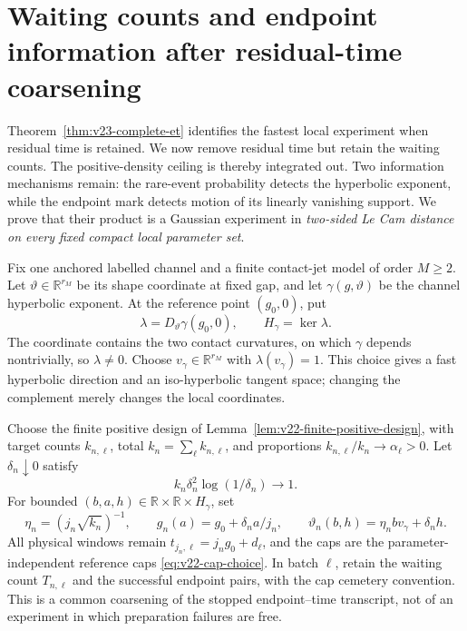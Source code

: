 \section{Waiting counts and endpoint information after residual-time coarsening}
\label{sec:v23-count-endpoint}

Theorem~\ref{thm:v23-complete-et} identifies the fastest local experiment
when residual time is retained.  We now remove residual time but retain the
waiting counts.  The positive-density ceiling is thereby integrated out.
Two information mechanisms remain: the rare-event probability detects the
hyperbolic exponent, while the endpoint mark detects motion of its linearly
vanishing support.  We prove that their product is a Gaussian experiment in
\emph{two-sided Le Cam distance on every fixed compact local parameter set}.

Fix one anchored labelled channel and a finite contact-jet model of order
\(M\ge2\).  Let \(\vartheta\in\mathbb R^{r_M}\) be its shape coordinate at
fixed gap, and let \(\gamma(g,\vartheta)\) be the channel hyperbolic exponent.
At the reference point \((g_0,0)\), put
\[
 \lambda=D_\vartheta\gamma(g_0,0),\qquad H_\gamma=\ker\lambda.
\]
The coordinate contains the two contact curvatures, on which \(\gamma\)
depends nontrivially, so \(\lambda\ne0\).  Choose
\(v_\gamma\in\mathbb R^{r_M}\) with \(\lambda(v_\gamma)=1\).
This choice gives a fast hyperbolic direction and an iso-hyperbolic tangent
space; changing the complement merely changes the local coordinates.

Choose the finite positive design of
Lemma~\ref{lem:v22-finite-positive-design}, with target counts
\(k_{n,\ell}\), total \(k_n=\sum_\ell k_{n,\ell}\), and proportions
\(k_{n,\ell}/k_n\to\alpha_\ell>0\).  Let \(\delta_n\downarrow0\) satisfy
\begin{equation}\label{eq:v23-count-endpoint-critical}
 k_n\delta_n^2\log(1/\delta_n)\longrightarrow1.
\end{equation}
For bounded \((b,a,h)\in\mathbb R\times\mathbb R\times H_\gamma\), set
\begin{equation}\label{eq:v23-count-endpoint-parameter}
 \eta_n=(j_n\sqrt{k_n})^{-1},\qquad
 g_n(a)=g_0+\delta_na/j_n,\qquad
 \vartheta_n(b,h)=\eta_nbv_\gamma+\delta_nh.
\end{equation}
All physical windows remain \(t_{j_n,\ell}=j_ng_0+d_\ell\), and the caps
are the parameter-independent reference caps
\eqref{eq:v22-cap-choice}.  In batch \(\ell\), retain the waiting count
\(T_{n,\ell}\) and the successful endpoint pairs, with the cap cemetery
convention.  This is a common coarsening of the stopped endpoint--time
transcript, not of an experiment in which preparation failures are free.

